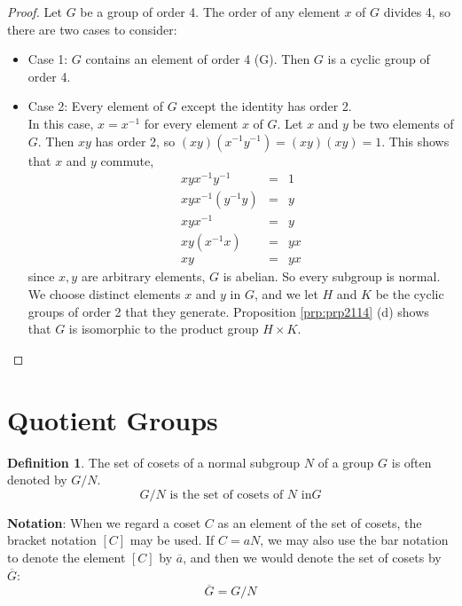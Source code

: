 \documentclass[
]{book}
\providecommand{\tightlist}{%
  \setlength{\itemsep}{0pt}\setlength{\parskip}{0pt}}
\theoremstyle{definition}
\newtheorem{definition}{Definition}[chapter]
\theoremstyle{definition}
\theoremstyle{definition}
\theoremstyle{definition}
\theoremstyle{remark}
\begin{document}
\begin{proof}

Let \(G\) be a group of order 4. The order of any element \(x\) of \(G\) divides 4, so there are two cases to consider:

\begin{itemize}
\tightlist
\item
  Case 1: \(G\) contains an element of order 4 (\textbar G). Then \(G\) is a cyclic group of order 4.
\item
  Case 2: Every element of \(G\) except the identity has order 2.\\
  In this case, \(x = x^{-1}\) for every element \(x\) of \(G\). Let \(x\) and \(y\) be two elements of \(G\). Then \(xy\) has order 2, so \((xy)(x^{-1}y^{-1}) = (xy)(xy) = 1\). This shows that \(x\) and \(y\) commute,
  \begin{eqnarray}
  xyx^{-1}y^{-1} &=& 1\\
  xyx^{-1}(y^{-1} y)&=& y\\
  xyx^{-1}&=& y\\
  xy(x^{-1}x)&=& yx\\
  xy &=& yx
  \end{eqnarray}
  since \(x,y\) are arbitrary elements, \(G\) is abelian. So every subgroup is normal. We choose distinct elements \(x\) and \(y\) in \(G\), and we let \(H\) and \(K\) be the cyclic groups of order 2 that they generate. Proposition \ref{prp:prp2114} (d) shows that \(G\) is isomorphic to the product group \(H \times K\).
\end{itemize}

\end{proof}

\hypertarget{quotient-groups}{%
\section{Quotient Groups}\label{quotient-groups}}

\begin{definition}
\protect\hypertarget{def:unnamed-chunk-37}{}\label{def:unnamed-chunk-37}The set of cosets of a normal subgroup \(N\) of a group \(G\) is often denoted by \(G / N\).
\[G / N \text{ is the set of cosets of $N$ in} G\]
\end{definition}

\textbf{Notation}: When we regard a coset \(C\) as an element of the set of cosets, the bracket notation \([C]\)
may be used.
If \(C = aN\), we may also use the bar notation to denote the element \([C]\) by \(\overline{a}\),
and then we would denote the set of cosets by \(\overline{G}\):
\[\overline{G} = G /N\]
\end{document}
